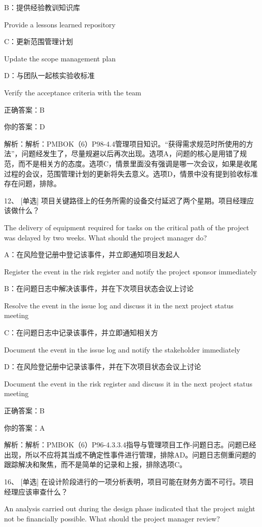 B：提供经验教训知识库

Provide a lessons learned repository

C：更新范围管理计划

Update the scope management plan

D：与团队一起核实验收标准

Verify the acceptance criteria with the team

正确答案：B

你的答案：D

解析：解析：PMBOK（6）P98-4.4管理项目知识。“获得需求规范时所使用的方法”，问题经发生了，尽量规避以后再次出现。选项A，问题的核心是用错了规范，而不是相关方的态度。选项C，情景里面没有强调是哪一次会议，如果是收尾过程的会议，范围管理计划的更新将失去意义。选项D，情景中没有提到验收标准存在问题，排除。

12、 [单选] 项目关键路径上的任务所需的设备交付延迟了两个星期。项目经理应该做什么？

The delivery of equipment required for tasks on the critical path of the project was delayed by two weeks. What should the project manager do?

A：在风险登记册中登记该事件，并立即通知项目发起人

Register the event in the risk register and notify the project sponsor immediately

B：在问题日志中解决该事件，并在下次项目状态会议上讨论

Resolve the event in the issue log and discuss it in the next project status meeting

C：在问题日志中记录该事件，并立即通知相关方

Document the event in the issue log and notify the stakeholder immediately

D：在风险登记册中记录该事件，并在下次项目状态会议上讨论

Document the event in the risk register and discuss it in the next project status meeting

正确答案：B

你的答案：A

解析：解析：PMBOK（6）P96-4.3.3.4指导与管理项目工作-问题日志。问题已经出现，所以不应将其当成不确定性事件进行管理，排除AD。问题日志侧重问题的跟踪解决和聚焦，而不是简单的记录和上报，排除选项C。

16、 [单选] 在设计阶段进行的一项分析表明，项目可能在财务方面不可行。项目经理应该审查什么？

An analysis carried out during the design phase indicated that the project might not be financially possible. What should the project manager review?

